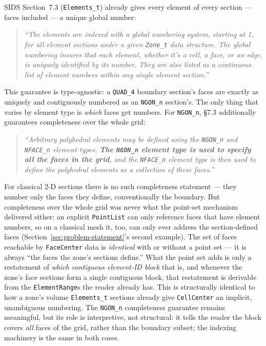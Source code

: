 \documentclass[11pt,letterpaper]{article}
\begin{document}
SIDS Section~7.3 (\texttt{Elements\_t}) already gives every element of
every section --- faces included --- a unique global number:

\begin{quote}\small\itshape
``The elements are indexed with a global numbering system, starting at 1,
for all element sections under a given \texttt{Zone\_t} data structure.
The global numbering insures that each element, whether it's a cell, a
face, or an edge, is uniquely identified by its number. They are also
listed as a continuous list of element numbers within any single element
section.''
\end{quote}

This guarantee is type-agnostic: a \texttt{QUAD\_4} boundary section's
faces are exactly as uniquely and contiguously numbered as an
\texttt{NGON\_n} section's. The only thing that varies by element type is
\emph{which} faces get numbers. For \texttt{NGON\_n}, \S7.3 additionally
guarantees completeness over the whole grid:

\begin{quote}\small\itshape
``Arbitrary polyhedral elements may be defined using the \texttt{NGON\_n}
and \texttt{NFACE\_n} element types. \textbf{The \texttt{NGON\_n} element
type is used to specify all the faces in the grid}, and the
\texttt{NFACE\_n} element type is then used to define the polyhedral
elements as a collection of these faces.''
\end{quote}

For classical 2-D sections there is no such completeness statement ---
they number only the faces they define, conventionally the boundary. But
completeness over the whole grid was never what the point-set mechanism
delivered either: an explicit \texttt{PointList} can only reference faces
that have element numbers, so on a classical mesh it, too, can only ever
address the section-defined faces (Section~\ref{sec:problem-statement}'s
second example). The set of faces reachable by \texttt{FaceCenter} data
is \emph{identical} with or without a point set --- it is always ``the
faces the zone's sections define.'' What the point set adds is only a
restatement of \emph{which contiguous element-ID block} that is, and
whenever the zone's face sections form a single contiguous block, that
restatement is derivable from the \texttt{ElementRange}s the reader
already has. This is structurally identical to how a zone's volume
\texttt{Elements\_t} sections already give \texttt{CellCenter} an
implicit, unambiguous numbering. The \texttt{NGON\_n} completeness
guarantee remains meaningful, but its role is interpretive, not
structural: it tells the reader the block covers \emph{all} faces of the
grid, rather than the boundary subset; the indexing machinery is the same
in both cases.
\end{document}
